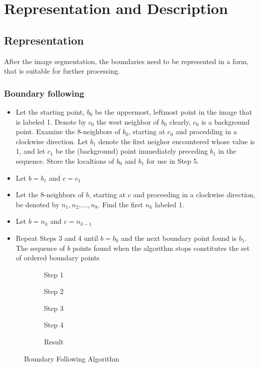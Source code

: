 \section{Representation and Description}
\label{sec:representationDescription}
\subsection{Representation}
After the image segmentation, the boundaries need to be represented in a form, that is suitable for further processing.
\subsubsection{Boundary following}
\begin{itemize}
\item Let the starting point, $b_0$ be the uppermost, leftmost point in the image that is labeled 1. Denote by $c_0$ the west neighbor of $b_0$ clearly, $c_0$ is a background point. Examine the 8-neighbors of $b_0$, starting at $c_0$ and procedding in a clockwise direction. Let $b_1$ denote the first neighor encountered whose value is 1, and let $c_1$ be the (background) point immediately preceding $b_1$ in the sequence. Store the localtions of $b_0$ and $b_1$ for use in Step 5.
\item Let $b=b_1$ and $c=c_1$
\item Let the 8-neighbors of $b$, starting at $c$ and proceeding in a clockwise direction, be denoted by $n_1,n_2,\ldots,n_8$. Find the first $n_k$ labeled 1.
\item Let $b=n_k$ and $c=n_{k-1}$
\item Repeat Steps 3 and 4 until $b=b_0$ and the next boundary point found is $b_1$. The sequence of $b$ points found when the algorithm stops constitutes the set of ordered boundary points
\end{itemize}
\begin{figure}[h]
	\centering
	\begin{subfigure}[b]{0.19\textwidth}
		\centering
		\caption{Step 1}
	\end{subfigure}
	\begin{subfigure}[b]{0.19\textwidth}
		\centering
		\caption{Step 2}
	\end{subfigure}
	\begin{subfigure}[b]{0.19\textwidth}
		\centering
		\caption{Step 3}
	\end{subfigure}
	\begin{subfigure}[b]{0.19\textwidth}
		\centering
		\caption{Step 4}
	\end{subfigure}
	\begin{subfigure}[b]{0.19\textwidth}
		\centering
		\caption{Result}
	\end{subfigure}
	\caption{Boundary Following Algorithm}
\end{figure}
